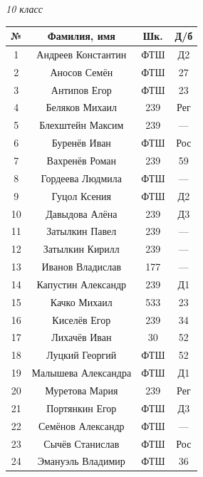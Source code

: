 \documentclass[12pt]{article}
\newlength{\h}
\newlength{\x}
\begin{document}
\begin{table}[ht]
  \hfill
  \begin{minipage}[t]{0.48\linewidth}\centering
    \begin{center}
      \textit{10 класс}
    \end{center}
    \begin{tabular}[h]{|c|c|c|c|}
      \hline
      \textbf{№} & \textbf{Фамилия, имя} & \textbf{Шк.} & \textbf{Д/б}\\
      \hline
      1 & Андреев Константин & ФТШ & Д2  \\ \hline
      2 & Аносов Семён & ФТШ & 27  \\ \hline
      3 & Антипов Егор & ФТШ & 23  \\ \hline
      4 & Беляков Михаил & 239 & Рег  \\ \hline
      5 & Блехштейн Максим & 239 & ---  \\ \hline
      6 & Буренёв Иван & ФТШ & Рос  \\ \hline
      7 & Вахренёв Роман & 239 & 59  \\ \hline
      8 & Гордеева Людмила & ФТШ & ---  \\ \hline
      9 & Гуцол Ксения & ФТШ & Д2  \\ \hline
      10 & Давыдова Алёна & 239 & Д3  \\ \hline
      11 & Затылкин Павел & 239 & ---  \\ \hline
      12 & Затылкин Кирилл & 239 & ---  \\ \hline
      13 & Иванов Владислав & 177 & ---  \\ \hline
      14 & Капустин Александр & 239 & Д1  \\ \hline
      15 & Качко Михаил & 533 & 23  \\ \hline
      16 & Киселёв Егор & 239 & 34  \\ \hline
      17 & Лихачёв Иван & 30 & 52  \\ \hline
      18 & Луцкий Георгий & ФТШ & 52  \\ \hline
      19 & Малышева Александра & ФТШ & Д1  \\ \hline
      20 & Муретова Мария & 239 & Рег  \\ \hline
      21 & Портянкин Егор & ФТШ & Д3  \\ \hline
      22 & Семёнов Александр & ФТШ & ---  \\ \hline
      23 & Сычёв Станислав & ФТШ & Рос  \\ \hline
      24 & Эмануэль Владимир & ФТШ & 36  \\ \hline
    \end{tabular}
  \end{minipage}
\end{table}
\end{document}
